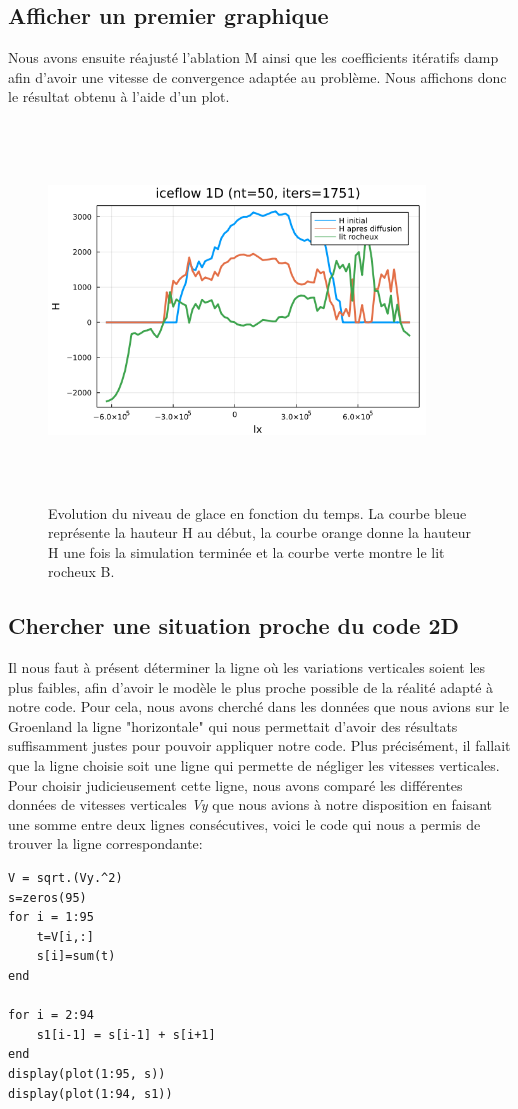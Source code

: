 \documentclass{article}
\begin{document}
\subsection{Afficher un premier graphique}
\vspace*{\fill}
Nous avons ensuite réajusté l'ablation M ainsi que les coefficients itératifs damp afin d'avoir une vitesse de convergence adaptée au problème.
Nous affichons donc le résultat obtenu à l'aide d'un plot.
\begin{figure}[!htpb]
\centering
\includegraphics[width=10cm, keepaspectratio=true, height=10cm]{Iceflow1D.png}
\caption{Evolution du niveau de glace en fonction du temps. La courbe bleue représente la hauteur H au début, la courbe orange donne la hauteur H une fois la simulation terminée et la courbe verte montre le lit rocheux B.}
\end{figure}
\vspace*{\fill}

\newpage
\subsection{Chercher une situation proche du code 2D}

Il nous faut à présent déterminer la ligne où les variations verticales soient les plus faibles, afin d'avoir le modèle le plus proche possible de la réalité adapté à notre code.
\newline
Pour cela, nous avons cherché dans les données que nous avions sur le Groenland la ligne "horizontale" qui nous permettait d'avoir des résultats suffisamment justes pour pouvoir appliquer notre code. Plus précisément, il fallait que la ligne choisie soit une ligne qui permette de négliger les vitesses verticales.
Pour choisir judicieusement cette ligne, nous avons comparé les différentes données de vitesses verticales \textit{Vy} que nous avions à notre disposition en faisant une somme entre deux lignes consécutives, voici le code qui nous a permis de trouver  la ligne correspondante: 
\begin{verbatim}
V = sqrt.(Vy.^2)
s=zeros(95)
for i = 1:95
    t=V[i,:]
    s[i]=sum(t)
end

for i = 2:94
    s1[i-1] = s[i-1] + s[i+1]
end
display(plot(1:95, s))
display(plot(1:94, s1))
\end{verbatim}
\end{document}

